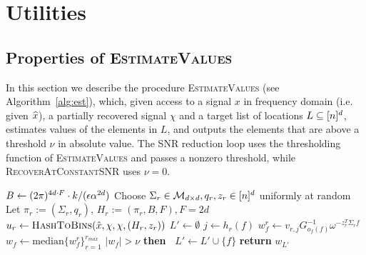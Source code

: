 \section{Utilities}\label{sec:utils}

\subsection{Properties of \textsc{EstimateValues}}
In this section we describe the procedure \textsc{EstimateValues} (see Algorithm~\ref{alg:est}), which, given access to a signal $x$ in frequency domain (i.e. given $\widehat{x}$), a partially recovered signal $\chi$ and a target list of locations $L\subseteq {[n]^d}$,
estimates values of the elements in $L$, and outputs the elements that are above a threshold $\nu$ in absolute value. The SNR reduction loop uses the thresholding function of \textsc{EstimateValues} and passes a nonzero threshold, while \textsc{RecoverAtConstantSNR} uses $\nu=0$.

\begin{algorithm}
\caption{\textsc{EstimateValues}($x, \chi, L, k, \e, \nu, r_{max}$)}\label{alg:est} 
\begin{algorithmic}[1] 
\State $B\gets (2\pi)^{4d\cdot F}\cdot k/({\epsilon} \alpha^{2d})$
\State Choose $\Sigma_r\in \mathcal{M}_{d\times d}, q_r, z_r\in {[n]^d}$ uniformly at random
\State Let $\pi_r:=(\Sigma_r, q_r)$, $H_r:=(\pi_r, B, F), F= 2d$
\State $u_r \gets \Call{HashToBins}{\hat x, \chi, \chi, (H_r, z_r)}$
\State {}
\EndFor
\State $L'\gets \emptyset$
\State $j\gets h_r(f)$ 
\State $w^r_f\gets v_{r, j} G^{-1}_{o_f(f)}\omega^{-z_r^T \Sigma_r f}$ 
\EndFor
\State $w_f\gets \text{median}\{w^r_f\}_{r=1}^ {r_{max}}$ 
 $|w_f|>\nu$ {\bf then~} $L'\gets L'\cup \{f\}$
\EndFor
\State \textbf{return} $w_{L'}$
\EndProcedure 
\end{algorithmic}
\end{algorithm}

